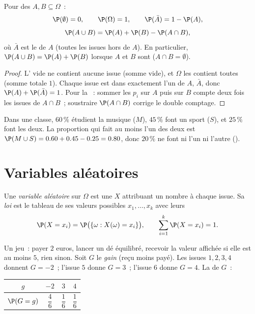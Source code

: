 \begin{proposition}\label{prop:g11:prob:rules}
Pour des  $A, B \subseteq \Omega$~:
\[
\P(\emptyset) = 0, \qquad \P(\Omega) = 1, \qquad
\P(\bar A) = 1 - \P(A),
\]
\[
\P(A \cup B) = \P(A) + \P(B) - \P(A \cap B),
\]
où $\bar A$ est le \emph{} de $A$ (toutes les issues hors
de $A$). En particulier, $\P(A \cup B) = \P(A) + \P(B)$ lorsque $A$ et
$B$ sont \emph{} ($A \cap B = \emptyset$).
\end{proposition}

\begin{proof}
L' vide ne contient aucune issue (somme vide), et $\Omega$ les
contient toutes (somme totale $1$). Chaque issue est dans exactement
l'un de $A$, $\bar A$, donc $\P(A) + \P(\bar A) = 1$. Pour la ~:
sommer les $p_i$ sur $A$ puis sur $B$ compte deux fois les issues de
$A \cap B$~; soustraire $\P(A \cap B)$ corrige le double comptage.
\end{proof}

\begin{example}
Dans une classe, $60\,\%$ étudient la musique ($M$), $45\,\%$ font un
sport ($S$), et $25\,\%$ font les deux. La proportion qui fait au moins
l'un des deux est $\P(M \cup S) = 0.60 + 0.45 - 0.25 = 0.80$, donc
$20\,\%$ ne font ni l'un ni l'autre ().
\end{example}

\section{Variables aléatoires}

\begin{definition}\label{def:g11:prob:rv}
Une \emph{variable aléatoire} sur $\Omega$ est
une  $X$ attribuant un nombre à chaque issue. Sa
\emph{loi} est le tableau de ses valeurs possibles
$x_1, \dots, x_k$ avec leurs 
\[
\P(X = x_i) = \P\bigl(\{\omega : X(\omega) = x_i\}\bigr),
\qquad
\sum_{i=1}^k \P(X = x_i) = 1 .
\]
\end{definition}

\begin{example}\label{ex:g11:prob:game}
Un jeu~: payer $2$ euros, lancer un dé équilibré, recevoir la valeur
affichée si elle est au moins $5$, rien sinon. Soit $G$ le
\emph{gain} (reçu moins payé). Les issues $1, 2, 3, 4$ donnent
$G = -2$~; l'issue $5$ donne $G = 3$~; l'issue $6$ donne $G = 4$. La 
de $G$~:
\begin{center}
\begin{tabular}{c|ccc}
$g$ & $-2$ & $3$ & $4$\\
\hline\rule{0pt}{11pt}%
$\P(G = g)$ & $\dfrac46$ & $\dfrac16$ & $\dfrac16$
\end{tabular}
\end{center}
\end{example}

